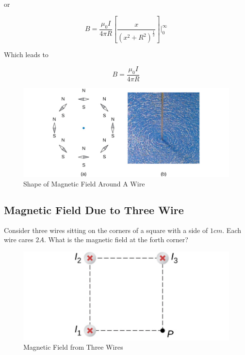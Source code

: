 \documentclass[14pt]{memoir}
\begin{document}
or

\begin{equation}
B = \frac{\mu_0 I}{4\pi R} [\frac{x}{(x^2 + R^2)^\frac{1}{2}}] \bigg\rvert_{0}^{\infty}
\end{equation}

Which leads to 

\begin{equation}
B = \frac{\mu_0 I}{4\pi R}
\end{equation}

\begin{figure}[H]
\begin{center}
\includegraphics[scale=0.50]{fig/fig_12_07.jpg}
\caption{Shape of Magnetic Field Around A Wire}
\label{fig:12_07}
\end{center}
\end{figure}

\subsection{Magnetic Field Due to Three Wire}

Consider three wires sitting on the corners of a square with a side of $1 cm$. Each wire cares $2 A$. What is the magnetic field at the forth corner?

\begin{figure}[H]
\begin{center}
\includegraphics[scale=0.50]{fig/fig_12_08.jpg}
\caption{Magnetic Field from Three Wires}
\label{fig:12_08}
\end{center}
\end{figure}
\end{document}
